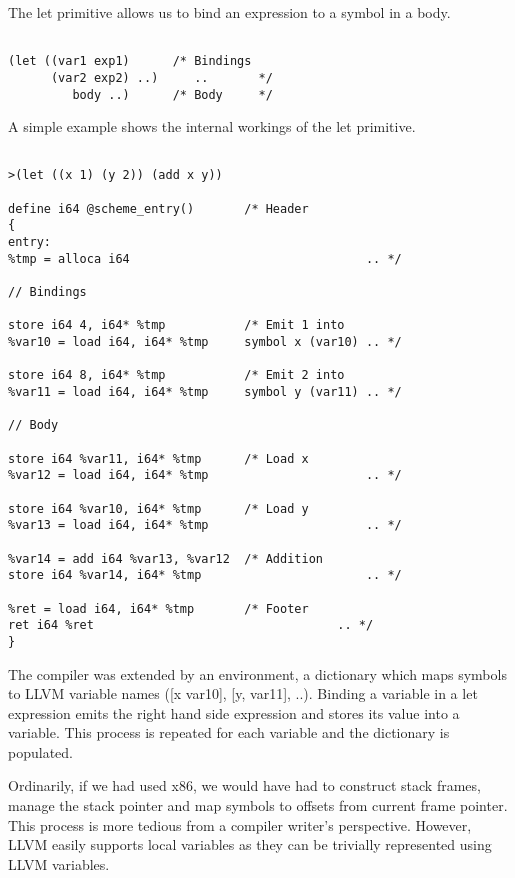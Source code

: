 \documentclass{article}
\begin{document}
The let primitive allows us to bind an expression to a symbol in a body. 

\begin{verbatim}

(let ((var1 exp1)      /* Bindings
      (var2 exp2) ..)     ..       */
         body ..)      /* Body     */   

\end{verbatim}

A simple example shows the internal workings of the let primitive.

\begin{verbatim}

>(let ((x 1) (y 2)) (add x y)) 

define i64 @scheme_entry()       /* Header
{                    
entry: 
%tmp = alloca i64                                 .. */

// Bindings       

store i64 4, i64* %tmp           /* Emit 1 into        
%var10 = load i64, i64* %tmp     symbol x (var10) .. */

store i64 8, i64* %tmp           /* Emit 2 into           
%var11 = load i64, i64* %tmp     symbol y (var11) .. */

// Body

store i64 %var11, i64* %tmp      /* Load x      
%var12 = load i64, i64* %tmp                      .. */

store i64 %var10, i64* %tmp      /* Load y
%var13 = load i64, i64* %tmp                      .. */

%var14 = add i64 %var13, %var12  /* Addition
store i64 %var14, i64* %tmp                       .. */

%ret = load i64, i64* %tmp       /* Footer
ret i64 %ret                                  .. */
}

\end{verbatim}

The compiler was extended by an environment, a dictionary which maps symbols to LLVM variable names ([x var10], [y, var11], ..). Binding a variable in a let expression emits the right hand side expression and stores its value into a variable. This process is repeated for each variable and the dictionary is populated. 

Ordinarily, if we had used x86, we would have had to construct stack frames, manage the stack pointer and map symbols to offsets from current frame pointer. This process is more tedious from a compiler writer's perspective. However, LLVM easily supports local variables as they can be trivially represented using LLVM variables.
\end{document}
